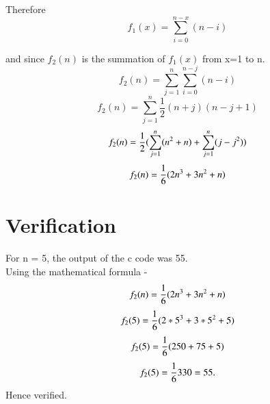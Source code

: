 \documentclass[journal,12pt,twocolumn]{IEEEtran}
\begin{document}
Therefore
\begin{equation}
f_1(x) = \sum_{i=0}^{n-x} (n-i)
\end{equation}

and since $f_2(n)$ is the summation of $f_1(x)$ from x=1 to n.\\
\begin{equation}
f_2(n) = \sum_{j=1}^{n} \sum_{i=0}^{n-j} (n-i)
\end{equation}
\begin{equation}
f_2(n) = \sum_{j=1}^{n} \frac{1}{2}(n+j)(n-j+1)
\end{equation}
\begin{equation}
f_2(n) = \frac{1}{2} (\sum_{j=1}^{n} (n\textsuperscript{2} + n) + \sum_{j=1}^{n} (j - j\textsuperscript{2}) )
\end{equation}
\begin{equation}
f_2(n) = \frac{1}{6} (2n\textsuperscript{3} + 3n\textsuperscript{2} + n)
\end{equation}


\section{Verification} 
For n = 5, the output of the c code was 55.\\
Using the mathematical formula -
\begin{equation}
f_2(n) = \frac{1}{6} (2n\textsuperscript{3} + 3n\textsuperscript{2} + n)
\end{equation}
\begin{equation}
f_2(5) = \frac{1}{6} (2*5\textsuperscript{3} + 3*5\textsuperscript{2} + 5) \\
\end{equation}
\begin{equation}
f_2(5) = \frac{1}{6} (250 + 75 +5) \\
\end{equation}
\begin{equation}
f_2(5) = \frac{1}{6} 330 = 55.\\
\end{equation}
Hence verified.
\end{document}
